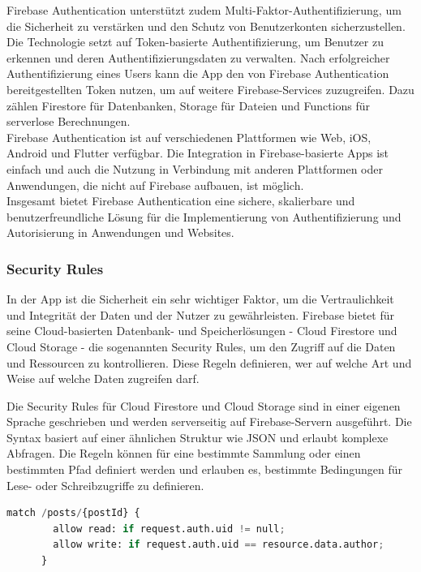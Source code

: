 Firebase Authentication unterstützt zudem Multi-Faktor-Authentifizierung, um die Sicherheit zu verstärken und den Schutz von Benutzerkonten sicherzustellen.
\\
Die Technologie setzt auf Token-basierte Authentifizierung, um Benutzer zu erkennen und deren Authentifizierungsdaten zu verwalten. Nach erfolgreicher Authentifizierung eines Users kann die App den von Firebase Authentication bereitgestellten Token nutzen, um auf weitere Firebase-Services zuzugreifen. Dazu zählen Firestore für Datenbanken, Storage für Dateien und Functions für serverlose Berechnungen.
\\
Firebase Authentication ist auf verschiedenen Plattformen wie Web, iOS, Android und Flutter verfügbar. Die Integration in Firebase-basierte Apps ist einfach und auch die Nutzung in Verbindung mit anderen Plattformen oder Anwendungen, die nicht auf Firebase aufbauen, ist möglich.
\\
Insgesamt bietet Firebase Authentication eine sichere, skalierbare und benutzerfreundliche Lösung für die Implementierung von Authentifizierung und Autorisierung in Anwendungen und Websites.

\subsubsection{Security Rules}\label{sec:security-rules}
In der App ist die Sicherheit ein sehr wichtiger Faktor,
um die Vertraulichkeit und Integrität der Daten und der
Nutzer zu gewährleisten. Firebase bietet für seine
Cloud-basierten Datenbank- und Speicherlösungen - Cloud
Firestore und Cloud Storage - die sogenannten Security
Rules\cite{firebase-rules-docs}\cite{firestore-rules-firestore-nochba}\cite{storage-rules-storage-nochba}, um den Zugriff auf
die Daten und Ressourcen zu kontrollieren. Diese Regeln
definieren, wer auf welche Art und Weise auf welche Daten
zugreifen darf.

Die Security Rules für Cloud Firestore und Cloud Storage sind in einer eigenen Sprache geschrieben und werden serverseitig auf Firebase-Servern ausgeführt. Die Syntax basiert auf einer ähnlichen Struktur wie JSON und erlaubt komplexe Abfragen. Die Regeln können für eine bestimmte Sammlung oder einen bestimmten Pfad definiert werden und erlauben es, bestimmte Bedingungen für Lese- oder Schreibzugriffe zu definieren.


\begin{lstlisting}[language=Python,caption=Security Rules Beispiel]
    match /posts/{postId} {
        allow read: if request.auth.uid != null;
        allow write: if request.auth.uid == resource.data.author;
      }
\end{lstlisting}

